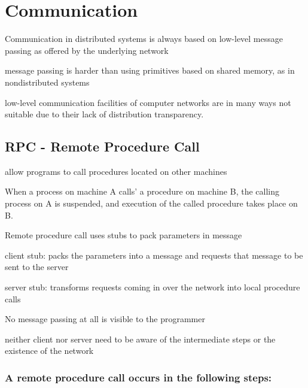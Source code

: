 \documentclass[ngerman,a4paper]{report}
\begin{document}


\chapter{Communication}

\begin{compactitem}
	\item Communication in distributed systems is always based on low-level message passing as offered by the underlying network
	\item message passing is harder than using primitives based on shared memory, as in nondistributed systems
	\item low-level communication facilities of computer networks are in many ways not suitable due to their lack of distribution transparency.
\end{compactitem}

\section{RPC - Remote Procedure Call}

\begin{compactitem}
	\item allow programs to call procedures located on other machines
	\item When a process on machine A calls' a procedure on machine B, the calling process on A is suspended, and execution of the called procedure takes place on B.
	\item Remote procedure call uses stubs to pack parameters in message
	\item client stub: packs the parameters into a message and requests that message to be sent to the server
	\item server stub: transforms requests coming in over the network into local procedure calls
	\item No message passing at all is visible to the programmer
	\item neither client nor server need to be aware of the intermediate steps or the existence of the network
\end{compactitem}

\subsection*{A remote procedure call occurs in the following steps:}
\end{document}
